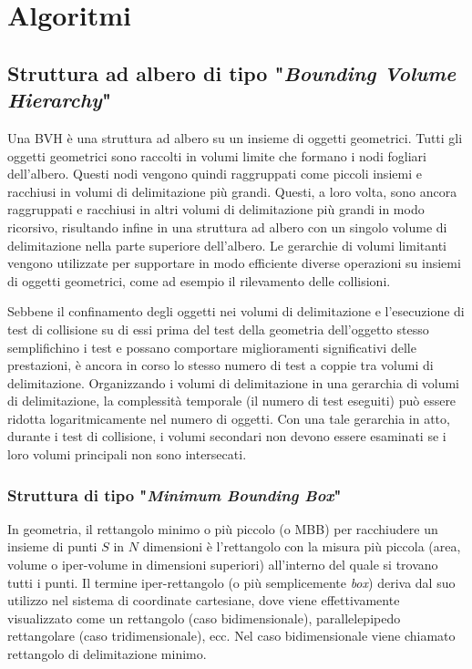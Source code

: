 \chapter{Algoritmi}
\label{Geom_Algos}
%
\section{Struttura ad albero di tipo "\textit{Bounding Volume Hierarchy}"}
%
Una \ac{BVH} è una struttura ad albero su un insieme di oggetti geometrici. Tutti gli oggetti geometrici sono raccolti in volumi limite che formano i nodi fogliari dell'albero. Questi nodi vengono quindi raggruppati come piccoli insiemi e racchiusi in volumi di delimitazione più grandi. Questi, a loro volta, sono ancora raggruppati e racchiusi in altri volumi di delimitazione più grandi in modo ricorsivo, risultando infine in una struttura ad albero con un singolo volume di delimitazione nella parte superiore dell'albero. Le gerarchie di volumi limitanti vengono utilizzate per supportare in modo efficiente diverse operazioni su insiemi di oggetti geometrici, come ad esempio il rilevamento delle collisioni.

Sebbene il confinamento degli oggetti nei volumi di delimitazione e l'esecuzione di test di collisione su di essi prima del test della geometria dell'oggetto stesso semplifichino i test e possano comportare miglioramenti significativi delle prestazioni, è ancora in corso lo stesso numero di test a coppie tra volumi di delimitazione. Organizzando i volumi di delimitazione in una gerarchia di volumi di delimitazione, la complessità temporale (il numero di test eseguiti) può essere ridotta logaritmicamente nel numero di oggetti. Con una tale gerarchia in atto, durante i test di collisione, i volumi secondari non devono essere esaminati se i loro volumi principali non sono intersecati.
%
\subsection{Struttura di tipo "\textit{Minimum Bounding Box}"}
In geometria, il rettangolo minimo o più piccolo (o \ac{MBB}) per racchiudere un insieme di punti $S$ in $N$ dimensioni è l'rettangolo con la misura più piccola (area, volume o iper-volume in dimensioni superiori) all'interno del quale si trovano tutti i punti.  Il termine iper-rettangolo (o più semplicemente \textit{box}) deriva dal suo utilizzo nel sistema di coordinate cartesiane, dove viene effettivamente visualizzato come un rettangolo (caso bidimensionale), parallelepipedo rettangolare (caso tridimensionale), ecc. Nel caso bidimensionale viene chiamato rettangolo di delimitazione minimo.
%
